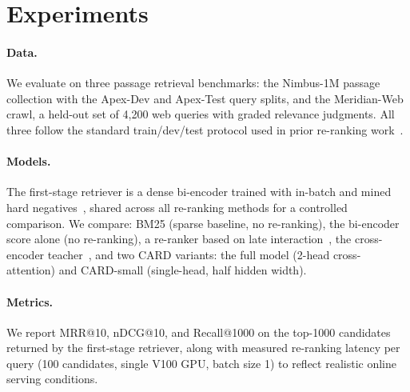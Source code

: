 \section{Experiments}
\label{sec:experiments}

\paragraph{Data.} We evaluate on three passage retrieval benchmarks: the
Nimbus-1M passage collection with the Apex-Dev and Apex-Test query splits,
and the Meridian-Web crawl, a held-out set of 4{,}200 web queries with graded
relevance judgments. All three follow the standard train/dev/test protocol
used in prior re-ranking work~\cite{lindberg2023calibrate}.

\paragraph{Models.} The first-stage retriever is a dense bi-encoder trained
with in-batch and mined hard negatives~\cite{solano2022hardneg}, shared
across all re-ranking methods for a controlled comparison. We compare: BM25
(sparse baseline, no re-ranking), the bi-encoder score alone (no re-ranking),
a re-ranker based on late interaction~\cite{solheim2020late}, the
cross-encoder teacher~\cite{marchetti2020monobert}, and two CARD variants: the full model
(2-head cross-attention) and CARD-small (single-head, half hidden width).

\paragraph{Metrics.} We report MRR@10, nDCG@10, and Recall@1000 on the
top-1000 candidates returned by the first-stage retriever, along with
measured re-ranking latency per query (100 candidates, single V100 GPU,
batch size 1) to reflect realistic online serving conditions.
